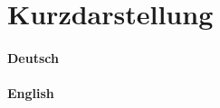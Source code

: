 \chapter*{Kurzdarstellung}
\thispagestyle{empty}
\subsubsection{Deutsch}
\blindtext 

\vfill
\subsubsection{English}
\blindtext